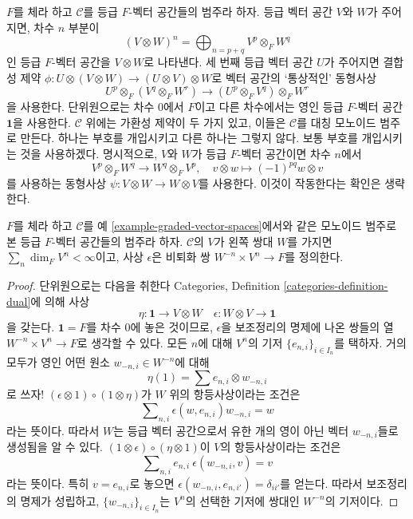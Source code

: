 \begin{example}
\label{example-graded-vector-spaces}
$F$를 체라 하고 $\mathcal{C}$를 등급 $F$-벡터 공간들의 범주라 하자.
등급 벡터 공간 $V$와 $W$가 주어지면, 차수 $n$ 부분이
$$
(V \otimes W)^n = \bigoplus\nolimits_{n = p + q} V^p \otimes_F W^q
$$
인 등급 $F$-벡터 공간을 $V \otimes W$로 나타낸다.
세 번째 등급 벡터 공간 $U$가 주어지면 결합성 제약
$\phi : U \otimes (V \otimes W) \to (U \otimes V) \otimes W$로
벡터 공간의 ‘통상적인’ 동형사상
$$
U^p \otimes_F (V^q \otimes_F W^r) \to (U^p \otimes_F V^q) \otimes_F W^r
$$
을 사용한다.
단위원으로는 차수 $0$에서 $F$이고 다른 차수에서는 영인 등급
$F$-벡터 공간 $\mathbf{1}$을 사용한다.
$\mathcal{C}$ 위에는 가환성 제약이 두 가지 있고, 이들은 $\mathcal{C}$를
대칭 모노이드 범주로 만든다. 하나는 부호를 개입시키고 다른 하나는
그렇지 않다. 보통 부호를
개입시키는 것을 사용하겠다. 명시적으로, $V$와 $W$가 등급
$F$-벡터 공간이면 차수 $n$에서
$$
V^p \otimes_F W^q \to W^q \otimes_F V^p,\quad
v \otimes w \mapsto (-1)^{pq} w \otimes v
$$
를 사용하는 동형사상 $\psi : V \otimes W \to W \otimes V$를
사용한다. 이것이 작동한다는 확인은 생략한다.
\end{example}

\begin{lemma}
\label{lemma-left-dual-graded-vector-spaces}
$F$를 체라 하고 $\mathcal{C}$를 예
\ref{example-graded-vector-spaces}에서와 같은 모노이드 범주로 본
등급 $F$-벡터 공간들의 범주라 하자. $\mathcal{C}$의 $V$가 왼쪽
쌍대 $W$를 가지면 $\sum_n \dim_F V^n < \infty$이고, 사상
$\epsilon$은 비퇴화 쌍 $W^{-n} \times V^n \to F$를 정의한다.
\end{lemma}

\begin{proof}
단위원으로는 다음을 취한다
Categories, Definition \ref{categories-definition-dual}에 의해 사상
$$
\eta : \mathbf{1} \to V \otimes W\quad
\epsilon : W \otimes V \to \mathbf{1}
$$
을 갖는다. $\mathbf{1} = F$를 차수 $0$에 놓은 것이므로,
$\epsilon$을 보조정리의 명제에 나온 쌍들의 열
$W^{-n} \times V^n \to F$로 생각할 수 있다.
모든 $n$에 대해 $V^n$의 기저 $\{e_{n, i}\}_{i \in I_n}$를 택하자.
거의 모두가 영인 어떤 원소 $w_{-n, i} \in W^{-n}$에 대해
$$
\eta(1) = \sum e_{n, i} \otimes w_{-n, i}
$$
로 쓰자! $(\epsilon \otimes 1) \circ (1 \otimes \eta)$가 $W$ 위의
항등사상이라는 조건은
$$
\sum\nolimits_{n, i} \epsilon(w, e_{n, i})w_{-n, i} = w
$$
라는 뜻이다. 따라서 $W$는 등급 벡터 공간으로서 유한 개의 영이 아닌
벡터 $w_{-n, i}$들로 생성됨을 알 수 있다.
$(1 \otimes \epsilon) \circ (\eta \otimes 1)$이 $V$의 항등사상이라는
조건은
$$
\sum\nolimits_{n, i} e_{n, i}\ \epsilon(w_{-n, i}, v) = v
$$
라는 뜻이다. 특히 $v = e_{n, i}$로 놓으면
$\epsilon(w_{-n, i}, e_{n, i'}) = \delta_{ii'}$를 얻는다.
따라서 보조정리의 명제가 성립하고,
$\{w_{-n, i}\}_{i \in I_n}$는 $V^n$의 선택한 기저에 쌍대인
$W^{-n}$의 기저이다.
\end{proof}







